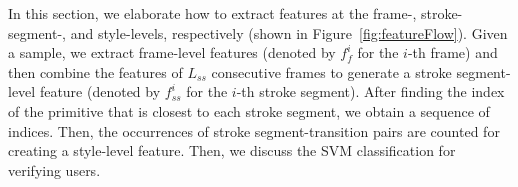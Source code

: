 %



In this section, we elaborate how to extract features at the frame-, stroke-segment-, and style-levels, respectively (shown in Figure~\ref{fig:featureFlow}). Given a sample, we extract frame-level features (denoted by $f_f^i$ for the $i$-th frame) and then combine the features of $L_{ss}$ consecutive frames to generate a stroke segment-level feature (denoted by $f_{ss}^i$ for the $i$-th stroke segment). After finding the index of the primitive that is closest to each stroke segment, we obtain a  sequence of indices. Then, the occurrences of stroke segment-transition pairs are counted for creating a style-level feature. Then, we discuss the SVM classification for verifying users. 



